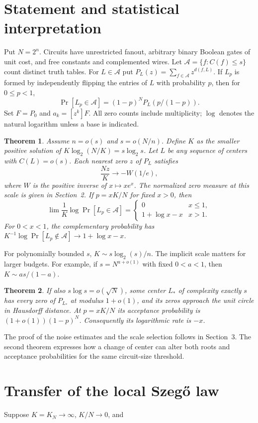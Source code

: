 \documentclass[11pt]{article}
\newtheorem{theorem}{Theorem}
\begin{document}
\section{Statement and statistical interpretation}
Put $N=2^n$. Circuits have unrestricted fanout, arbitrary binary Boolean gates of unit cost, and free constants and complemented wires. Let $\mathcal A=\{f:C(f)\le s\}$ count distinct truth tables. For $L\in\mathcal A$ put $P_L(z)=\sum_{f\in\mathcal A}z^{d(f,L)}$. If $L_p$ is formed by independently flipping the entries of $L$ with probability $p$, then for $0\le p<1$,
\[
 \Pr[L_p\in\mathcal A]=(1-p)^N P_L(p/(1-p)).
\]
Set $F=P_0$ and $a_k=[z^k]F$. All zero counts include multiplicity; $\log$ denotes the natural logarithm unless a base is indicated.
\begin{theorem}
Assume $n=o(s)$ and $s=o(N/n)$. Define $K$ as the smaller positive solution of $K\log_2(N/K)=s\log_2 s$. Let $L$ be any sequence of centers with $C(L)=o(s)$. Each nearest zero $z$ of $P_L$ satisfies
\[
                  \frac{Nz}{K}\longrightarrow-W(1/e),
\]
where $W$ is the positive inverse of $x\mapsto xe^x$. The normalized zero measure at this scale is given in Section~2. If $p=xK/N$ for fixed $x>0$, then
\[
 \lim \frac1K\log\Pr[L_p\in\mathcal A]=
 \begin{cases}0&x\le1,\\1+\log x-x&x>1.\end{cases}
\]
For $0<x<1$, the complementary probability has
$K^{-1}\log\Pr[L_p\notin\mathcal A]\to1+\log x-x$.
\end{theorem}
For polynomially bounded $s$, $K\sim s\log_2(s)/n$. The implicit scale matters for larger budgets. For example, if $s=N^{a+o(1)}$ with fixed $0<a<1$, then $K\sim as/(1-a)$.
\begin{theorem}
If also $s\log s=o(\sqrt N)$, some center $L_*$ of complexity exactly $s$ has every zero of $P_{L_*}$ at modulus $1+o(1)$, and its zeros approach the unit circle in Hausdorff distance. At $p=xK/N$ its acceptance probability is $(1+o(1))(1-p)^N$. Consequently its logarithmic rate is $-x$.
\end{theorem}
The proof of the noise estimates and the scale selection follows in Section~3. The second theorem expresses how a change of center can alter both roots and acceptance probabilities for the same circuit-size threshold.
\section{Transfer of the local Szeg\H{o} law}
Suppose \(K=K_N\to\infty\), \(K/N\to0\), and
\end{document}

